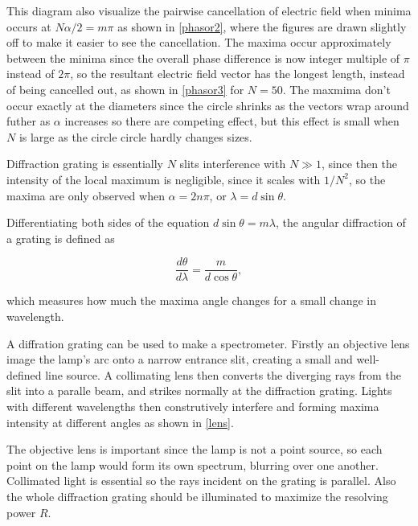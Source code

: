 \documentclass[english,a4paper,12pt]{report}
\begin{document}
This diagram also visualize the pairwise cancellation of electric field when minima occurs at \(N \alpha /2 = m\pi \) as shown in \cref{phasor2}, where the figures are drawn slightly off to make it easier to see the cancellation. The maxima occur approximately between the minima since the overall phase difference is now integer multiple of \(\pi \) instead of \(2\pi \), so the resultant electric field vector has the longest length, instead of being cancelled out, as shown in \cref{phasor3} for \(N= 50\). The maxmima don't occur exactly at the diameters since the circle shrinks as the vectors wrap around futher as \(\alpha \) increases so there are competing effect, but this effect is small when \(N\) is large as the circle circle hardly changes sizes.  



Diffraction grating is essentially \(N\) slits interference with \(N \gg 1\), since then the intensity of the local maximum is negligible, since it scales with \(1/N^2\), so the maxima are only observed when \(\alpha = 2n\pi \), or \(\lambda = d\sin \theta \).    

Differentiating both sides of the equation \(d \sin \theta = m \lambda \), the angular diffraction of a grating is defined as 

\begin{equation}
    \frac{d \theta }{d \lambda } =  \frac{m}{d \cos \theta },
\end{equation}

which measures how much the maxima angle changes for a small change in wavelength.

A diffration grating can be used to make a spectrometer. Firstly an objective lens image the lamp's arc onto a narrow entrance slit, creating a small and well-defined line source. A collimating lens then converts the diverging rays from the slit into a paralle beam, and strikes normally at the diffraction grating. Lights with different wavelengths then construtively interfere and forming maxima intensity at different angles as shown in \cref{lens}. 

The objective lens is important since the lamp is not a point source, so each point on the lamp would form its own spectrum, blurring over one another. Collimated light is essential so the rays incident on the grating is parallel. Also the whole diffraction grating should be illuminated to maximize the resolving power \(R\).
\end{document}
